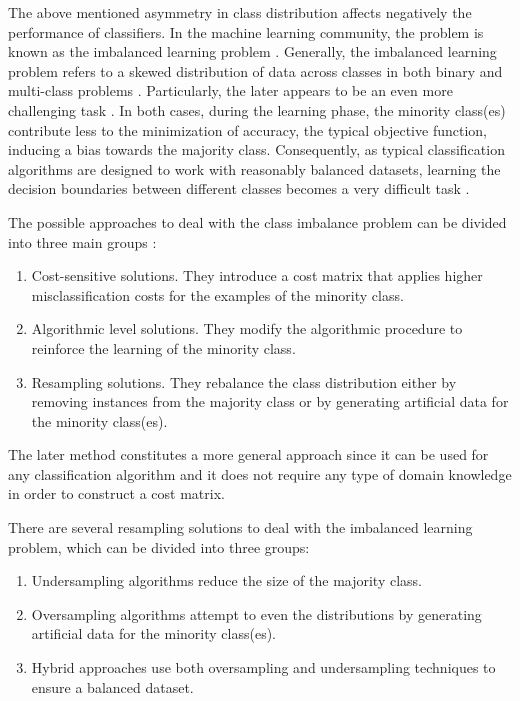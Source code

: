 \documentclass[remotesensing,article,submit,moreauthors,pdftex]{Definitions/mdpi}
\begin{document}
The above mentioned asymmetry in class distribution affects negatively the
performance of classifiers. In the machine learning community, the problem is
known as the imbalanced learning problem \cite{Chawla2004}. Generally, the
imbalanced learning problem refers to a skewed distribution of data across
classes in both binary and multi-class problems \cite{Abdi2016}. Particularly,
the later appears to be an even more challenging task \cite{Garcia2018}. In both
cases, during the learning phase, the minority class(es) contribute less to the
minimization of accuracy, the typical objective function, inducing a bias
towards the majority class. Consequently, as typical classification algorithms
are designed to work with reasonably balanced datasets, learning the decision
boundaries between different classes becomes a very difficult task
\cite{Saez2016}.

The possible approaches to deal with the class imbalance problem can be divided
into three main groups \cite{Fernandez2013}:

\begin{enumerate}

	\item Cost-sensitive solutions. They introduce a cost matrix that applies
	      higher misclassification costs for the examples of the minority class.

	\item Algorithmic level solutions. They modify the algorithmic procedure to
	      reinforce the learning of the minority class.

	\item Resampling solutions. They rebalance the class distribution either by
	      removing instances from the majority class or by generating artificial data
	      for the minority class(es).

\end{enumerate}

The later method constitutes a more general approach since it can be used for
any classification algorithm and it does not require any type of domain
knowledge in order to construct a cost matrix.

There are several resampling solutions to deal with the imbalanced learning
problem, which can be divided into three groups:

\begin{enumerate}

	\item Undersampling algorithms reduce the size of the majority class.

	\item Oversampling algorithms attempt to even the distributions by
	      generating artificial data for the minority class(es).

	\item Hybrid approaches use both oversampling and undersampling techniques
	      to ensure a balanced dataset.

\end{enumerate}
\end{document}
